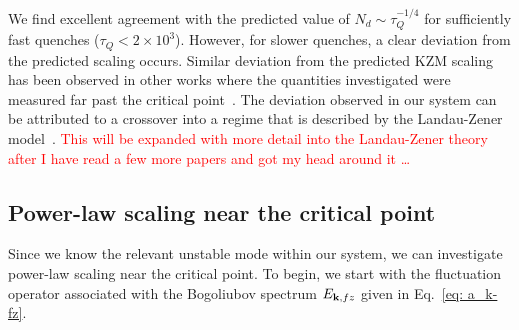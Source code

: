 We find excellent agreement with the predicted value of
\(N_d \sim \tau_Q^{-1/4}\) for sufficiently fast quenches (\(\tau_Q < 2
\times 10^3\)).
However, for slower quenches, a clear deviation from the predicted scaling
occurs.
Similar deviation from the predicted KZM scaling has been observed in other
works where the quantities investigated were measured far past the critical
point~\cite{Su2013, Swislocki2013}.
The deviation observed in our system can be attributed to a crossover into a
regime that is described by the Landau-Zener model~\cite{Zurek2005,Damski2005,
Pellegrini2008,Divakaran2008}.
\textcolor{red}{This will be expanded with more detail into the
Landau-Zener theory after I have read a few more papers and got my head around
it \ldots}

\subsection{Power-law scaling near the critical point}
Since we know the relevant unstable mode within our system, we can investigate
power-law scaling near the critical point.
To begin, we start with the fluctuation operator associated with the
Bogoliubov spectrum \(E_{\vb{k}, fz}\) given in Eq.~\eqref{eq: a_k-fz}.
